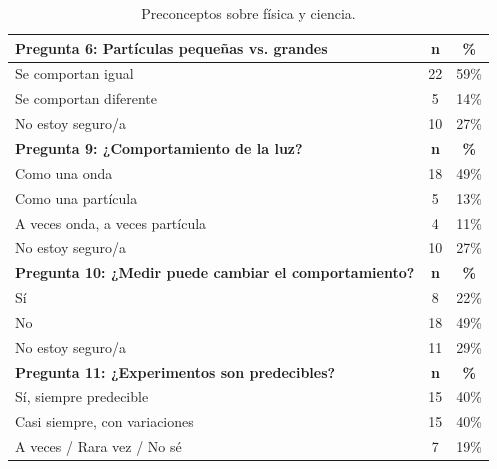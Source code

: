 \documentclass[10pt,a4paper]{article}
\begin{document}
\begin{table}[h!]
\centering
\caption{Preconceptos sobre física y ciencia.}
\begin{tabular}{|l|c|c|}
\hline
\textbf{Pregunta 6: Partículas pequeñas vs. grandes} & \textbf{n} & \textbf{\%} \\
\hline
Se comportan igual & 22 & 59\% \\
Se comportan diferente & 5 & 14\% \\
No estoy seguro/a & 10 & 27\% \\
\hline
\textbf{Pregunta 9: ¿Comportamiento de la luz?} & \textbf{n} & \textbf{\%} \\
\hline
Como una onda & 18 & 49\% \\
Como una partícula & 5 & 13\% \\
A veces onda, a veces partícula & 4 & 11\% \\
No estoy seguro/a & 10 & 27\% \\
\hline
\textbf{Pregunta 10: ¿Medir puede cambiar el comportamiento?} & \textbf{n} & \textbf{\%} \\
\hline
Sí & 8 & 22\% \\
No & 18 & 49\% \\
No estoy seguro/a & 11 & 29\% \\
\hline
\textbf{Pregunta 11: ¿Experimentos son predecibles?} & \textbf{n} & \textbf{\%} \\
\hline
Sí, siempre predecible & 15 & 40\% \\
Casi siempre, con variaciones & 15 & 40\% \\
A veces / Rara vez / No sé & 7 & 19\% \\
\hline
\end{tabular}
\end{table}
\end{document}
